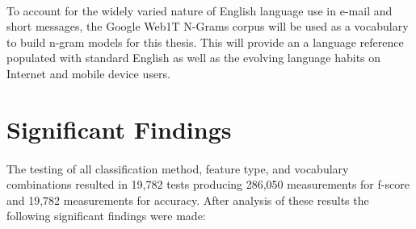 \paragraph*{} To account for the widely varied nature of English language use in e-mail and short messages, the Google Web1T N-Grams corpus will be used as a vocabulary to build n-gram models for this thesis.  This will provide an a language reference populated with standard English as well as the evolving language habits on Internet and mobile device users.


\section{Significant Findings}
\paragraph*{} The testing of all classification method, feature type, and vocabulary combinations resulted in 19,782 tests producing 286,050 measurements for f-score and 19,782 measurements for accuracy.  After analysis of these results the following significant findings were made:
